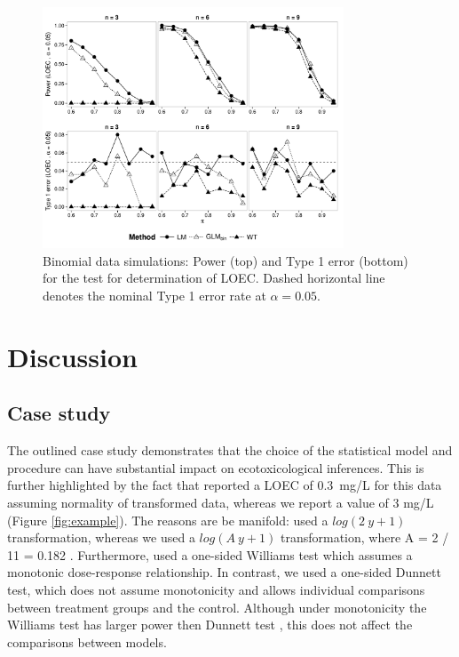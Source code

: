 \documentclass{scrartcl}
\begin{document}
\begin{figure}
  \centering
  \includegraphics[width = 0.8\textwidth]{p_loec_p.pdf}
  \caption{
  Binomial data simulations: 
  Power (top) and Type 1 error (bottom) for the test for determination of LOEC. 
  Dashed horizontal line denotes the nominal Type 1 error rate at $\alpha = 0.05$.
  }
  \label{fig:p_loec_p}
\end{figure}


\section{Discussion}
\label{sec:disc}
\subsection{Case study}
The outlined case study demonstrates that the choice of the statistical model and procedure can have substantial impact on ecotoxicological inferences.
This is further highlighted by the fact that \citet{brock_minimum_2015} reported a LOEC of \mbox{0.3 mg/L} for this data assuming normality of transformed data, whereas we report a value of 3 mg/L (Figure \ref{fig:example}).
The reasons are be manifold: \citep{brock_minimum_2015} used a $log(2~y + 1)$ transformation, whereas we used a $log(A~y + 1)$ transformation, where A = 2 / 11 = 0.182 \citep{van_den_brink_impact_2000}.
Furthermore, \citet{brock_minimum_2015} used a one-sided Williams test which assumes a monotonic dose-response relationship.
In contrast, we used a one-sided Dunnett test, which does not assume monotonicity and allows individual comparisons between treatment groups and the control.
Although under monotonicity the Williams test has larger power then Dunnett test \citep{jaki_statistical_2013}, this does not affect the comparisons between models.
\end{document}
